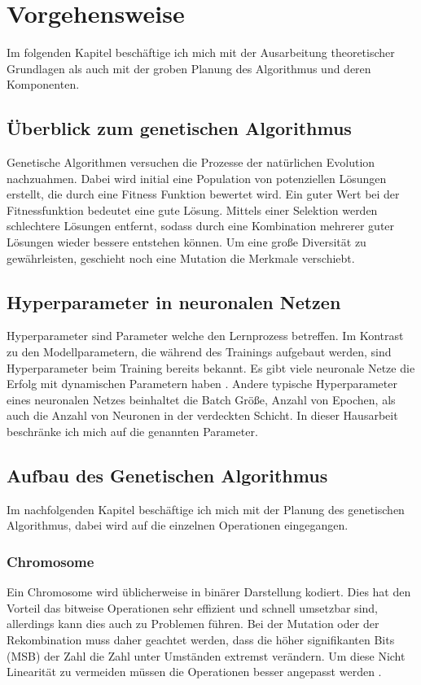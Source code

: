 \chapter{Vorgehensweise} 
Im folgenden Kapitel beschäftige ich mich mit der Ausarbeitung theoretischer Grundlagen als auch mit der groben Planung des Algorithmus und deren Komponenten.
\section{Überblick zum genetischen Algorithmus}
Genetische Algorithmen versuchen die Prozesse der natürlichen Evolution nachzuahmen. Dabei wird initial eine Population von potenziellen Lösungen erstellt, die durch eine Fitness Funktion bewertet wird. Ein guter Wert bei der Fitnessfunktion bedeutet eine gute Lösung. Mittels einer Selektion werden schlechtere Lösungen entfernt, sodass durch eine Kombination mehrerer guter Lösungen wieder bessere entstehen können. Um eine große Diversität zu gewährleisten, geschieht noch eine Mutation die Merkmale verschiebt. 
\section{Hyperparameter in neuronalen Netzen}
Hyperparameter sind Parameter welche den Lernprozess betreffen. Im Kontrast zu den Modellparametern, die während des Trainings aufgebaut werden, sind Hyperparameter beim Training bereits bekannt. Es gibt viele neuronale Netze die Erfolg mit dynamischen Parametern haben \parencite{schaul_no_2013}. Andere typische Hyperparameter eines neuronalen Netzes beinhaltet die Batch Größe, Anzahl von Epochen, als auch die Anzahl von Neuronen in der verdeckten Schicht. In dieser Hausarbeit beschränke ich mich auf die genannten Parameter.
\section{Aufbau des Genetischen Algorithmus}
Im nachfolgenden Kapitel beschäftige ich mich mit der Planung des genetischen Algorithmus, dabei wird auf die einzelnen Operationen eingegangen.
\subsection{Chromosome}
Ein Chromosome wird üblicherweise in binärer Darstellung kodiert. Dies hat den Vorteil das bitweise Operationen sehr effizient und schnell umsetzbar sind, allerdings kann dies auch zu Problemen führen. Bei der Mutation oder der Rekombination muss daher geachtet werden, dass die höher signifikanten Bits (MSB) der Zahl die Zahl unter Umständen extremst verändern. Um diese Nicht Linearität zu vermeiden müssen die Operationen besser angepasst werden \parencite{herrera_tackling_1998}.  

